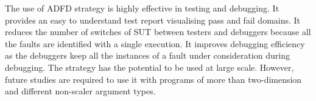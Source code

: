 The use of ADFD strategy is highly effective in testing and debugging. It provides an easy to understand test report visualising pass and fail domains. It reduces the number of switches of SUT between testers and debuggers because all the faults are identified with a single execution. It improves debugging efficiency as the debuggers keep all the instances of a fault under consideration during debugging. The strategy has the potential to be used at large scale. However, future studies are required to use it with programs of more than two-dimension and different non-scaler argument types.








